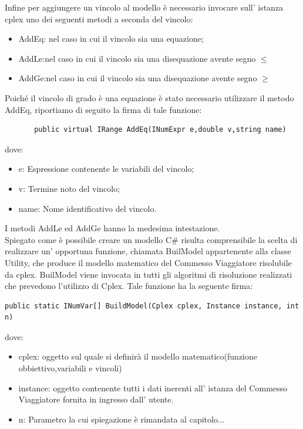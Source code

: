 \documentclass[11pt]{article}
\begin{document}
Infine per aggiungere un vincolo al modello è necessario invocare sull' istanza cplex uno dei seguenti metodi a seconda del vincolo:

\begin{itemize}
\item AddEq: nel caso in cui il vincolo sia una equazione;
\item  AddLe:nel caso in cui il vincolo sia una disequazione avente segno $\leq$
\item  AddGe:nel caso in cui il vincolo sia una disequazione avente segno $\geq$
\end{itemize}

Poich\'e il vincolo di grado \`e una equazione \`e stato necessario utilizzare il metodo AddEq, riportiamo di seguito la firma di tale funzione:

\begin{lstlisting}
       public virtual IRange AddEq(INumExpr e,double v,string name)
\end{lstlisting}

dove:

\begin{itemize}
\item e: Espressione contenente le variabili del vincolo;
\item  v: Termine noto del vincolo;
\item  name: Nome identificativo del vincolo.
\end{itemize}

I metodi AddLe ed AddGe hanno la medesima intestazione. \\
Spiegato come \`e possibile creare un modello C\# risulta comprensibile la scelta di realizzare un' opportuna funzione, chiamata BuilModel appartenente alla classe Utility, che produce il modello matematico del Commesso Viaggiatore risolubile da cplex. BuilModel viene invocata in tutti gli algoritmi di risoluzione realizzati che prevedono l'utilizzo di Cplex. Tale funzione ha la seguente firma:

\begin{lstlisting}
public static INumVar[] BuildModel(Cplex cplex, Instance instance, int n)
\end{lstlisting}
dove:


\begin{itemize}
\item cplex: oggetto sul quale si definirà il modello matematico(funzione obbiettivo,variabili e vincoli)
\item instance: oggetto contenente tutti i dati inerenti all' istanza del Commesso Viaggiatore fornita in ingresso dall' utente.
\item n: Parametro la cui spiegazione \`e rimandata al capitolo...
\end{itemize}
\end{document}
